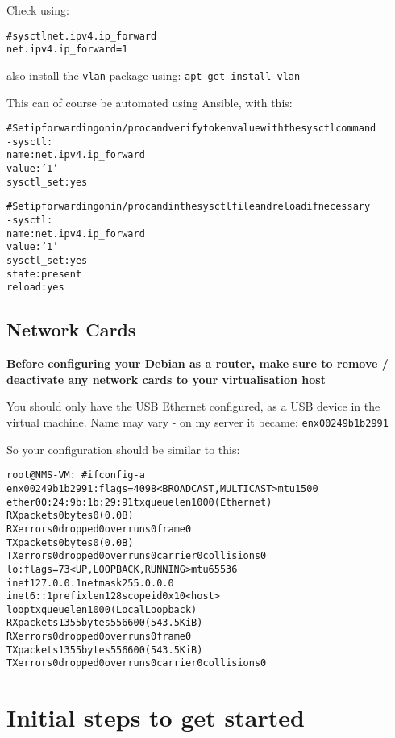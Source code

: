 \documentclass[a4paper,11pt,notitlepage]{report}
\begin{document}
Check using:
\begin{alltt}
# sysctl net.ipv4.ip_forward
net.ipv4.ip_forward = 1
\end{alltt}

also install the \verb+vlan+ package using: \verb+apt-get install vlan+

This can of course be automated using Ansible, with this:
\begin{alltt}
  # Set ip forwarding on in /proc and verify token value with the sysctl command
  - sysctl:
      name: net.ipv4.ip_forward
      value: '1'
      sysctl_set: yes

  # Set ip forwarding on in /proc and in the sysctl file and reload if necessary
  - sysctl:
      name: net.ipv4.ip_forward
      value: '1'
      sysctl_set: yes
      state: present
      reload: yes
\end{alltt}

\subsection*{Network Cards}

{\bf Before configuring your Debian as a router, make sure to remove / deactivate any network cards to your virtualisation host}

You should only have the USB Ethernet configured, as a USB device in the virtual machine. Name may vary - on my server it became: \verb+enx00249b1b2991+

So your configuration should be similar to this:
\begin{alltt}
root@NMS-VM:~# ifconfig  -a
enx00249b1b2991: flags=4098<BROADCAST,MULTICAST>  mtu 1500
        ether 00:24:9b:1b:29:91  txqueuelen 1000  (Ethernet)
        RX packets 0  bytes 0 (0.0 B)
        RX errors 0  dropped 0  overruns 0  frame 0
        TX packets 0  bytes 0 (0.0 B)
        TX errors 0  dropped 0 overruns 0  carrier 0  collisions 0
lo: flags=73<UP,LOOPBACK,RUNNING>  mtu 65536
        inet 127.0.0.1  netmask 255.0.0.0
        inet6 ::1  prefixlen 128  scopeid 0x10<host>
        loop  txqueuelen 1000  (Local Loopback)
        RX packets 1355  bytes 556600 (543.5 KiB)
        RX errors 0  dropped 0  overruns 0  frame 0
        TX packets 1355  bytes 556600 (543.5 KiB)
        TX errors 0  dropped 0 overruns 0  carrier 0  collisions 0
\end{alltt}


\section*{Initial steps to get started}
\end{document}
